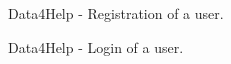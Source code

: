 \begin{figure}[ht]
    \caption{Data4Help - Registration of a user.}
    \label{RV1}
\end{figure}

\begin{figure}[ht]
    \caption{Data4Help - Login of a user.}
    \label{RV2}
\end{figure}


